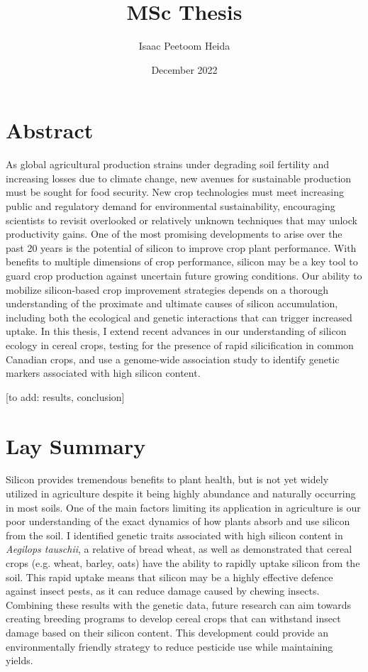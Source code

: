 \documentclass[12pt, letterpaper, ]{report}
\title{MSc Thesis}
\author{Isaac Peetoom Heida}
\date{December 2022}
\begin{document}


\tableofcontents

\chapter{Abstract}

As global agricultural production strains under degrading soil fertility and increasing losses due to climate change, new avenues for sustainable production must be sought for food security. New crop technologies must meet increasing public and regulatory demand for environmental sustainability, encouraging scientists to revisit overlooked or relatively unknown techniques that may unlock productivity gains. One of the most promising developments to arise over the past 20 years is the potential of silicon to improve crop plant performance. With benefits to multiple dimensions of crop performance, silicon may be a key tool to guard crop production against uncertain future growing conditions. Our ability to mobilize silicon-based crop improvement strategies depends on a thorough understanding of the proximate and ultimate causes of silicon accumulation, including both the ecological and genetic interactions that can trigger increased uptake. In this thesis, I extend recent advances in our understanding of silicon ecology in cereal crops, testing for the presence of rapid silicification in common Canadian crops, and use a  genome-wide association study to identify genetic markers associated with high silicon content. 

[to add: results, conclusion]

\chapter{Lay Summary}

Silicon provides tremendous benefits to plant health, but is not yet widely utilized in agriculture despite it being highly abundance and naturally occurring in most soils. One of the main factors limiting its application in agriculture is our poor understanding of the exact dynamics of how plants absorb and use silicon from the soil. I identified genetic traits associated with high silicon content in \textit{Aegilops tauschii}, a relative of bread wheat, as well as demonstrated that cereal crops (e.g. wheat, barley, oats) have the ability to rapidly uptake silicon from the soil. This rapid uptake means that silicon may be a highly effective defence against insect pests, as it can reduce damage caused by chewing insects. Combining these results with the genetic data, future research can aim towards creating breeding programs to develop cereal crops that can withstand insect damage based on their silicon content. This development could provide an environmentally friendly strategy to reduce pesticide use while maintaining yields.
\end{document}
